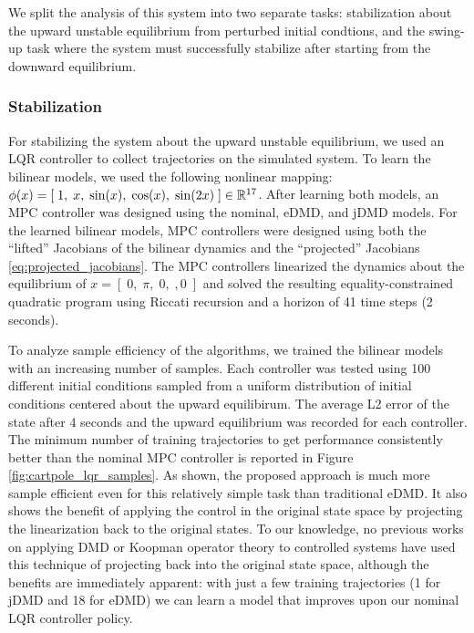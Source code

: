 \documentclass{article}
\begin{document}
We split the analysis of this system into two separate tasks: stabilization about the upward
unstable equilibrium from perturbed initial condtions, and the swing-up task where the 
system must successfully stabilize after starting from the downward equilibrium.

\subsubsection{Stabilization}

For stabilizing the system about the upward unstable equilibrium, we used an LQR controller
to collect trajectories on the simulated system. To learn
the bilinear models, we used the following nonlinear mapping: $\phi(x) = [\; 1,\; x,\;
\sin(x),\; \cos(x),\; \sin(2x)\; ] \in \mathbb{R}^{17}$.  After learning both models, an MPC
controller was designed using the nominal, eDMD, and jDMD models. For the learned bilinear
models, MPC controllers were designed using both the ``lifted'' Jacobians of the bilinear 
dynamics and the ``projected'' Jacobians \eqref{eq:projected_jacobians}. The MPC controllers
linearized the dynamics about the equilibrium of $x = [\;0,\; \pi,\; 0,\;, 0\;]$ and solved
the resulting equality-constrained quadratic program using Riccati recursion and a horizon
of 41 time steps (2 seconds). 

To analyze sample efficiency of the algorithms, we trained the bilinear models with an 
increasing number of samples. Each controller was tested using 100 different initial
conditions sampled from a uniform distribution of initial conditions centered about the 
upward equilibirum. The average L2 error of the state after 4 seconds and the upward 
equilibrium was recorded for each controller. The minimum number of training trajectories to
get performance consistently better than the nominal MPC controller is reported in Figure 
\ref{fig:cartpole_lqr_samples}. As shown, the proposed approach is much more sample
efficient even for this relatively simple task than traditional eDMD. It also shows the
benefit of applying the control in the original state space by projecting the linearization
back to the original states. To our knowledge, no previous works on applying DMD or Koopman
operator theory to controlled systems have used this technique of projecting back into the
original state space, although the benefits are immediately apparent: with just a few
training trajectories (1 for jDMD and 18 for eDMD) we can learn a model that improves upon
our nominal LQR controller policy.
\end{document}
